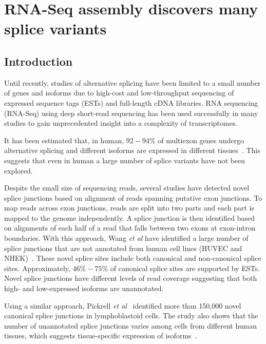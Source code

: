 \chapter{RNA-Seq assembly discovers many splice variants}
\section{Introduction}

Until recently, studies of alternative splicing have been limited to a
small number of genes and isoforms due to high-cost and low-throughput
sequencing of expressed sequence tags (ESTs) and full-length cDNA
libraries.  RNA sequencing (RNA-Seq) using deep short-read sequencing
has been used successfully in many studies to gain unprecedented
insight into a complexity of transcriptomes.

It has been estimated that, in human, $92-94$\% of multiexon genes
undergo alternative splicing and different isoforms are expressed in
different tissues~\cite{Wang:2008ea}.  This suggests that even in human
a large number of splice variants have not been explored.


Despite the small size of sequencing reads, several studies have
detected novel splice junctions based on alignment of reads spanning
putative exon junctions.  To map reads across exon junctions,
reads are split into two parts and each part is mapped to the genome
independently.  A splice junction is then identified based on
alignments of each half of a read that falls between two exons at
exon-intron boundaries.  With this approach, Wang \emph{et al} have
identified a large number of splice junctions that are not annotated
from human cell lines (HUVEC and NHEK)~\cite{Wang:2011jq}.  These novel
splice sites include both canonical and non-canonical splice sites.
Approximately, $46\%-75\%$ of canonical splice sites are supported by
ESTs.  Novel splice junctions have different levels of read coverage
suggesting that both high- and low-expressed isoforms are unannotated.

Using a similar approach, Pickrell {\em et al}~\cite{Pickrell:2010gt}
identified more than 150,000 novel canonical splice junctions in lymphoblastoid
cells.  The study also shows that the number of unannotated splice junctions
varies among cells from different human tissues, which suggests tissue-specific
expression of isoforms~\cite{Pickrell:2010gt}.

